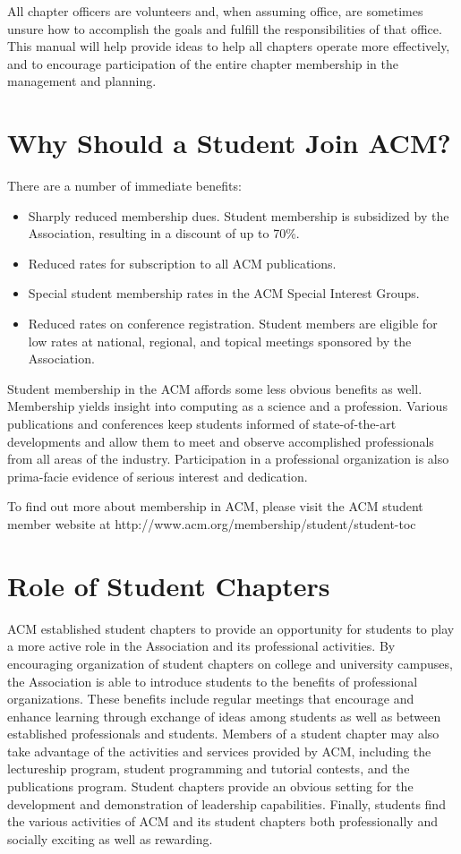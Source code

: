 All chapter officers are volunteers and, when assuming office, are sometimes unsure how to accomplish the goals and fulfill the responsibilities of that office. This manual will help provide ideas to help all chapters operate more effectively, and to encourage participation of the entire chapter membership in the management and planning.

\section{Why Should a Student Join ACM?}
\label{sec:sec03}

There are a number of immediate benefits:
	\begin{itemize}
		\item Sharply reduced membership dues. Student membership is subsidized by the Association, resulting in a discount of up to 70\%.
      \item Reduced rates for subscription to all ACM publications.
		\item Special student membership rates in the ACM Special Interest Groups.
		\item Reduced rates on conference registration. Student members are eligible for low rates at national, regional, and topical meetings sponsored by the Association.
	\end{itemize}

Student membership in the ACM affords some less obvious benefits as well. Membership yields insight into computing as a science and a profession. Various publications and conferences keep students informed of state-of-the-art developments and allow them to meet and observe accomplished professionals from all areas of the industry. Participation in a professional organization is also prima-facie evidence of serious interest and dedication.

To find out more about membership in ACM, please visit the ACM student member website at http://www.acm.org/membership/student/student-toc

\section{Role of Student Chapters}
\label{sec:sec04}

ACM established student chapters to provide an opportunity for students to play a more active role in the Association and its professional activities. By encouraging organization of student chapters on college and university campuses, the Association is able to introduce students to the benefits of professional organizations. These benefits include regular meetings that encourage and enhance learning through exchange of ideas among students as well as between established professionals and students. Members of a student chapter may also take advantage of the activities and services provided by ACM, including the lectureship program, student programming and tutorial contests, and the publications program. Student chapters provide an obvious setting for the development and demonstration of leadership capabilities. Finally, students find the various activities of ACM and its student chapters both professionally and socially exciting as well as rewarding.

